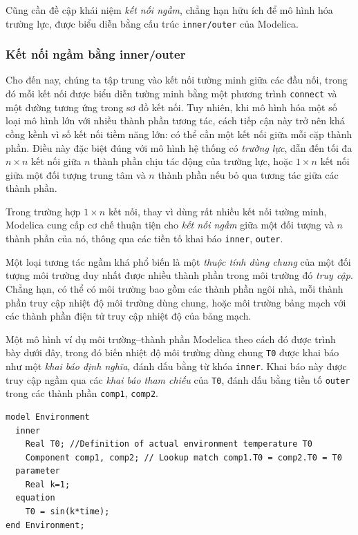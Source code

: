 Cũng cần đề cập khái niệm \emph{kết nối ngầm}, chẳng hạn hữu ích để mô hình hóa trường lực, được biểu diễn bằng cấu trúc \texttt{inner/outer} của Modelica.

\subsubsection{Kết nối ngầm bằng inner/outer}
Cho đến nay, chúng ta tập trung vào kết nối tường minh giữa các đầu nối, trong đó mỗi kết nối được biểu diễn tường minh bằng một phương trình \texttt{connect} và một đường tương ứng trong sơ đồ kết nối. Tuy nhiên, khi mô hình hóa một số loại mô hình lớn với nhiều thành phần tương tác, cách tiếp cận này trở nên khá cồng kềnh vì số kết nối tiềm năng lớn: có thể cần một kết nối giữa mỗi cặp thành phần. Điều này đặc biệt đúng với mô hình hệ thống có \emph{trường lực}, dẫn đến tối đa $n\times n$ kết nối giữa $n$ thành phần chịu tác động của trường lực, hoặc $1\times n$ kết nối giữa một đối tượng trung tâm và $n$ thành phần nếu bỏ qua tương tác giữa các thành phần.

Trong trường hợp $1\times n$ kết nối, thay vì dùng rất nhiều kết nối tường minh, Modelica cung cấp cơ chế thuận tiện cho \emph{kết nối ngầm} giữa một đối tượng và $n$ thành phần của nó, thông qua các tiền tố khai báo \texttt{inner}, \texttt{outer}.

Một loại tương tác ngầm khá phổ biến là một \emph{thuộc tính dùng chung} của một đối tượng môi trường duy nhất được nhiều thành phần trong môi trường đó \emph{truy cập}. Chẳng hạn, có thể có môi trường bao gồm các thành phần ngôi nhà, mỗi thành phần truy cập nhiệt độ môi trường dùng chung, hoặc môi trường bảng mạch với các thành phần điện tử truy cập nhiệt độ của bảng mạch.

Một mô hình ví dụ môi trường--thành phần Modelica theo cách đó được trình bày dưới đây, trong đó biến nhiệt độ môi trường dùng chung \texttt{T0} được khai báo như một \emph{khai báo định nghĩa}, đánh dấu bằng từ khóa \texttt{inner}. Khai báo này được truy cập ngầm qua các \emph{khai báo tham chiếu} của \texttt{T0}, đánh dấu bằng tiền tố \texttt{outer} trong các thành phần \texttt{comp1}, \texttt{comp2}.
\begin{verbatim}
model Environment
  inner
    Real T0; //Definition of actual environment temperature T0
    Component comp1, comp2; // Lookup match comp1.T0 = comp2.T0 = T0
  parameter
    Real k=1;
  equation
    T0 = sin(k*time);
end Environment;
\end{verbatim}

